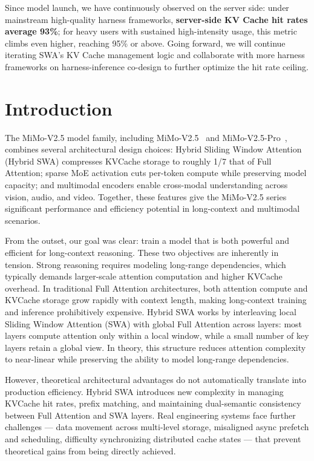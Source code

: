 Since model launch, we have continuously observed on the server side: under mainstream high-quality harness frameworks, \textbf{server-side KV Cache hit rates average 93\%}; for heavy users with sustained high-intensity usage, this metric climbs even higher, reaching 95\% or above. Going forward, we will continue iterating SWA's KV Cache management logic and collaborate with more harness frameworks on harness-inference co-design to further optimize the hit rate ceiling.

\section{Introduction}


The MiMo-V2.5 model family, including MiMo-V2.5~\citep{mimov25} and MiMo-V2.5-Pro~\citep{mimov25pro}, combines several architectural design choices: Hybrid Sliding Window Attention (Hybrid SWA) compresses KVCache storage to roughly 1/7 that of Full Attention; sparse MoE activation cuts per-token compute while preserving model capacity; and multimodal encoders enable cross-modal understanding across vision, audio, and video. Together, these features give the MiMo-V2.5 series significant performance and efficiency potential in long-context and multimodal scenarios.

From the outset, our goal was clear: train a model that is both powerful and efficient for long-context reasoning. These two objectives are inherently in tension. Strong reasoning requires modeling long-range dependencies, which typically demands larger-scale attention computation and higher KVCache overhead. In traditional Full Attention architectures, both attention compute and KVCache storage grow rapidly with context length, making long-context training and inference prohibitively expensive. Hybrid SWA works by interleaving local Sliding Window Attention (SWA) with global Full Attention across layers: most layers compute attention only within a local window, while a small number of key layers retain a global view. In theory, this structure reduces attention complexity to near-linear while preserving the ability to model long-range dependencies.

However, theoretical architectural advantages do not automatically translate into production efficiency. Hybrid SWA introduces new complexity in managing KVCache hit rates, prefix matching, and maintaining dual-semantic consistency between Full Attention and SWA layers. Real engineering systems face further challenges — data movement across multi-level storage, misaligned async prefetch and scheduling, difficulty synchronizing distributed cache states — that prevent theoretical gains from being directly achieved.

